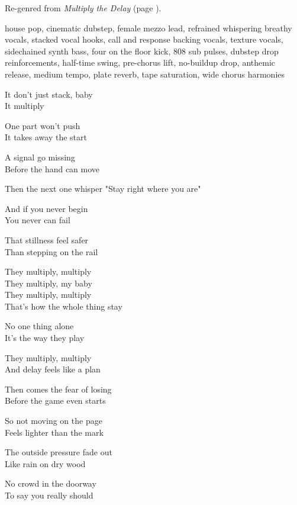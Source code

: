 
\begin{notes}
Re-genred from \emph{Multiply the Delay} (page \pageref{sec:multiply-the-delay}).
\end{notes}
\begin{style}
house pop, cinematic dubstep, female mezzo lead, refrained whispering breathy vocals, stacked vocal hooks, call and response backing vocals, texture vocals, sidechained synth bass, four on the floor kick, 808 sub pulses, dubstep drop reinforcements, half-time swing, pre-chorus lift, no-buildup drop, anthemic release, medium tempo, plate reverb, tape saturation, wide chorus harmonies
\end{style}
\begin{lyrics}
It don't just stack, baby\\
It multiply

One part won't push\\
It takes away the start

A signal go missing\\
Before the hand can move

Then the next one whisper
"Stay right where you are"

And if you never begin\\
You never can fail

That stillness feel safer\\
Than stepping on the rail

They multiply, multiply\\
They multiply, my baby\\
They multiply, multiply\\
That's how the whole thing stay

No one thing alone\\
It's the way they play

They multiply, multiply\\
And delay feels like a plan

Then comes the fear of losing\\
Before the game even starts

So not moving on the page\\
Feels lighter than the mark

The outside pressure fade out\\
Like rain on dry wood

No crowd in the doorway\\
To say you really should


\end{lyrics}

